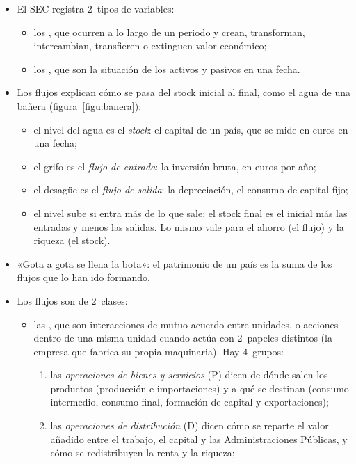\documentclass[11pt]{article}
\begin{document}
\begin{itemize}
\item El SEC registra 2~tipos de variables:
  \begin{itemize}
  \item los , que ocurren a lo largo de un periodo y crean, transforman, intercambian, transfieren o extinguen valor económico;
  \item los , que son la situación de los activos y pasivos en una fecha.
  \end{itemize}
\item Los flujos explican cómo se pasa del stock inicial al final, como el agua de una bañera (figura~\ref{figu:banera}):
  \begin{itemize}
  \item el nivel del agua es el \emph{stock}: el capital de un país, que se mide en euros en una fecha;
  \item el grifo es el \emph{flujo de entrada}: la inversión bruta, en euros por año;
  \item el desagüe es el \emph{flujo de salida}: la depreciación, el consumo de capital fijo;
  \item el nivel sube si entra más de lo que sale: el stock final es el inicial más las entradas y menos las salidas. Lo mismo vale para el ahorro (el flujo) y la riqueza (el stock).
  \end{itemize}
\item «Gota a gota se llena la bota»: el patrimonio de un país es la suma de los flujos que lo han ido formando.
\item Los flujos son de 2~clases:
  \begin{itemize}
  \item las , que son interacciones de mutuo acuerdo entre unidades, o acciones dentro de una misma unidad cuando actúa con 2~papeles distintos (la empresa que fabrica su propia maquinaria). Hay 4~grupos\nocite{SEC2010}:
    \begin{enumerate}
    \item las \emph{operaciones de bienes y servicios} (P) dicen de dónde salen los productos (producción e importaciones) y a qué se destinan (consumo intermedio, consumo final, formación de capital y exportaciones);
    \item las \emph{operaciones de distribución} (D) dicen cómo se reparte el valor añadido entre el trabajo, el capital y las Administraciones Públicas, y cómo se redistribuyen la renta y la riqueza;

\end{enumerate}
\end{itemize}
\end{itemize}
\end{document}
